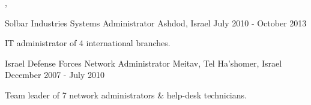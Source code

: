 \begin{cventries}
    \begin{cvskills}
       {, }
       {}
    \end{cvskills}
    
  \cventry
    {Solbar Industries}
    {Systems Administrator}
    {Ashdod, Israel}
    {July 2010 - October 2013}
    {
      \begin{cvitems}
        \item {IT administrator of 4 international branches.}
      \end{cvitems}
    }
    \vspace{3.0mm}

  \cventry
    {Israel Defense Forces}
    {Network Administrator}
    {Meitav, Tel Ha'shomer, Israel}
    {December 2007 - July 2010}
    {
      \begin{cvitems}
        \item {Team leader of 7 network administrators \& help-desk technicians.}
      \end{cvitems}
    }
    \vspace{2.0mm}

\end{cventries}

